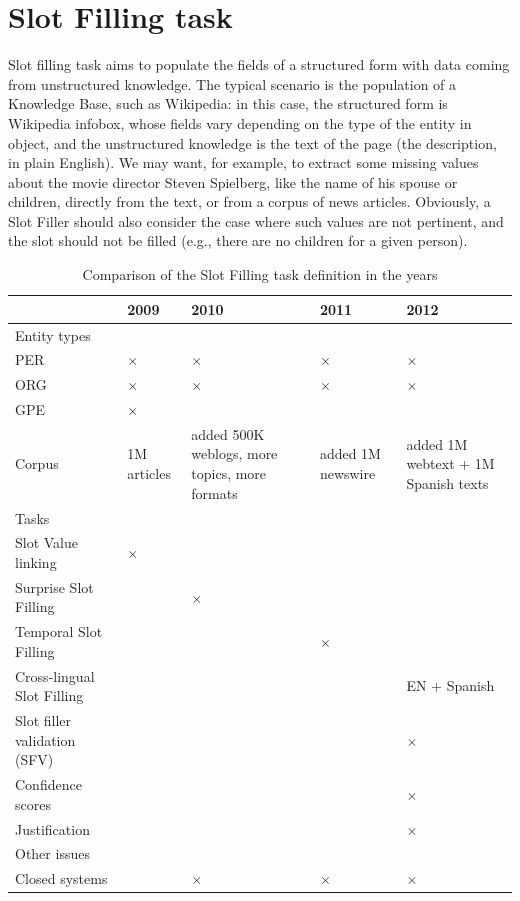 \documentclass[a4paper,11pt]{report}
\newcommand{\tick}{$\times$}
\begin{document}
\section{Slot Filling task}
Slot filling task aims to populate the fields of a structured form with data coming from unstructured knowledge. The typical scenario is the population of a Knowledge Base, such as Wikipedia: in this case, the structured form is Wikipedia infobox, whose fields vary depending on the type of the entity in object, and the unstructured knowledge is the text of the page (the description, in plain English).
We may want, for example, to extract some missing values about the movie director Steven Spielberg, like the name of his spouse or children, directly from the text, or from a corpus of news articles. Obviously, a Slot Filler should also consider the case where such values are not pertinent, and the slot should not be filled (e.g., there are no children for a given person).
\begin{table}
\begin{tabularx}{\linewidth}{lXXXX}
 & 2009 & 2010 & 2011 & 2012 \\
\hline Entity types \\ 
  PER & \tick & \tick & \tick & \tick \\
  ORG & \tick & \tick & \tick & \tick \\
  GPE & \tick & & & \\
\hline Corpus & 1M articles & added 500K weblogs, more topics, more formats & added 1M newswire & added 1M webtext + 1M Spanish texts \\
\hline Tasks\\ 
 Slot Value linking & \tick & & & \\
  Surprise Slot Filling & & \tick & & \\
  Temporal Slot Filling & & & \tick & \\
  Cross-lingual Slot Filling & & & & EN + Spanish \\
  Slot filler validation (SFV) & & & & \tick \\
  Confidence scores & & & & \tick \\
  Justification & & & & \tick \\
\hline Other issues\\ 
 Closed systems & & \tick & \tick & \tick \\
 
\end{tabularx}
\caption{Comparison of the Slot Filling task definition in the years}
\label{tab:sf}
\end{table}
\end{document}
